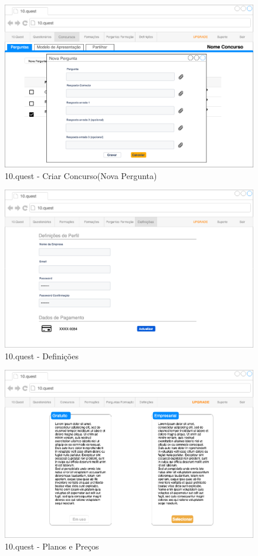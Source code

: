 \begin{figure}[ht!]
	\begin{center}
		\includegraphics[width=1\textwidth]{img/prototipos/19.png}
		\caption{10.quest - Criar Concurso(Nova Pergunta)}
		\label{10q-}
	\end{center}
\end{figure}

\begin{figure}[ht!]
	\begin{center}
		\includegraphics[width=1\textwidth]{img/prototipos/20.png}
		\caption{10.quest - Definições}
		\label{10q-}
	\end{center}
\end{figure}

\begin{figure}[ht!]
	\begin{center}
		\includegraphics[width=1\textwidth]{img/prototipos/21.png}
		\caption{10.quest - Planos e Preços}
		\label{10q-}
	\end{center}
\end{figure}




